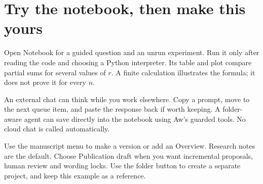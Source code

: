 \section{Try the notebook, then make this yours}\label{sec:next}
Open Notebook for a guided question and an unrun experiment. Run it only after
reading the code and choosing a Python interpreter. Its table and plot compare
partial sums for several values of $r$. A finite calculation illustrates the
formula; it does not prove it for every $n$.

An external chat can think while you work elsewhere. Copy a prompt, move to the
next queue item, and paste the response back if worth keeping. A folder-aware
agent can save directly into the notebook using Aw's guarded tools. No cloud
chat is called automatically.

Use the manuscript menu to make a version or add an Overview. Research notes
are the default. Choose Publication draft when you want incremental proposals,
human review and wording locks. Use the folder button to create a separate
project, and keep this example as a reference.
